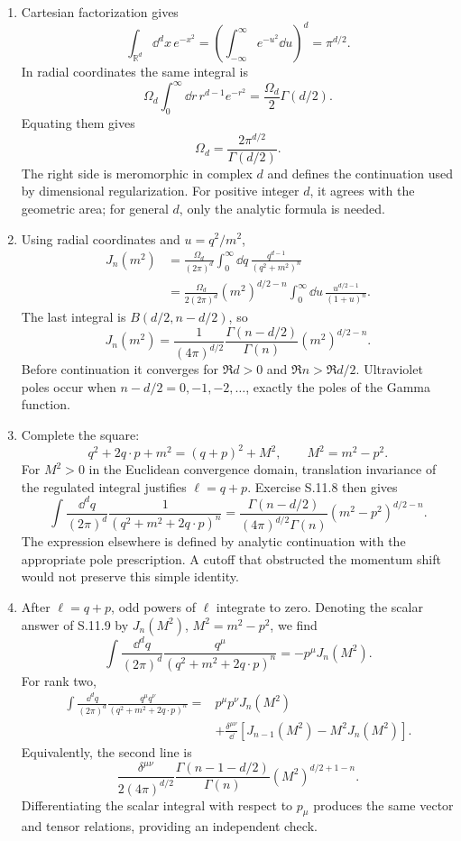 \begin{enumerate}
\begin{enumerate}
\item
Cartesian factorization gives
\[
 \int_{\mathbb R^d}\dd^dx\,e^{-x^2}
 =\left(\int_{-\infty}^{\infty}e^{-u^2}\dd u\right)^d
 =\pi^{d/2}.
\]
In radial coordinates the same integral is
\[
 \Omega_d\int_0^\infty \dd r\,r^{d-1}e^{-r^2}
 =\frac{\Omega_d}{2}\Gamma(d/2).
\]
Equating them gives
\[
 \boxed{\qquad
 \Omega_d=\frac{2\pi^{d/2}}{\Gamma(d/2)}.
 \qquad}
\]
The right side is meromorphic in complex \(d\) and defines the continuation
used by dimensional regularization.  For positive integer \(d\), it agrees
with the geometric area; for general \(d\), only the analytic formula is
needed.
\item
Using radial coordinates and \(u=q^2/m^2\),
\[
\begin{aligned}
 J_n(m^2)
 &=\frac{\Omega_d}{(2\pi)^d}\int_0^\infty
 \dd q\,\frac{q^{d-1}}{(q^2+m^2)^n}\\
 &=\frac{\Omega_d}{2(2\pi)^d}(m^2)^{d/2-n}
 \int_0^\infty \dd u\,\frac{u^{d/2-1}}{(1+u)^n}.
\end{aligned}
\]
The last integral is
\(B(d/2,n-d/2)\), so
\[
 \boxed{\;
 J_n(m^2)=\frac{1}{(4\pi)^{d/2}}
 \frac{\Gamma(n-d/2)}{\Gamma(n)}
 (m^2)^{d/2-n}.
 \;}
\]
Before continuation it converges for
\(\Re d>0\) and \(\Re n>\Re d/2\).  Ultraviolet poles occur when
\(n-d/2=0,-1,-2,\ldots\), exactly the poles of the Gamma function.
\item
Complete the square:
\[
 q^2+2q\cdot p+m^2=(q+p)^2+M^2,\qquad M^2=m^2-p^2.
\]
For \(M^2>0\) in the Euclidean convergence domain, translation invariance of
the regulated integral justifies \(\ell=q+p\).  Exercise S.11.8 then gives
\[
 \boxed{\;
 \int\frac{\dd^dq}{(2\pi)^d}
 \frac{1}{(q^2+m^2+2q\cdot p)^n}
 =\frac{\Gamma(n-d/2)}
 {(4\pi)^{d/2}\Gamma(n)}
 (m^2-p^2)^{d/2-n}.
 \;}
\]
The expression elsewhere is defined by analytic continuation with the
appropriate pole prescription.  A cutoff that obstructed the momentum shift
would not preserve this simple identity.
\item
After \(\ell=q+p\), odd powers of \(\ell\) integrate to zero.  Denoting the
scalar answer of S.11.9 by \(J_n(M^2)\), \(M^2=m^2-p^2\), we find
\[
 \boxed{\;
 \int\frac{\dd^dq}{(2\pi)^d}
 \frac{q^\mu}{(q^2+m^2+2q\cdot p)^n}
 =-p^\mu J_n(M^2).
 \;}
\]
For rank two,
\[
\begin{aligned}
 \int\frac{\dd^dq}{(2\pi)^d}
 \frac{q^\mu q^\nu}{(q^2+m^2+2q\cdot p)^n}
 ={}&p^\mu p^\nu J_n(M^2)\\
 &+\frac{\delta^{\mu\nu}}{\dd}
 [J_{n-1}(M^2)-M^2J_n(M^2)].
\end{aligned}
\]
Equivalently, the second line is
\[
 \frac{\delta^{\mu\nu}}{2(4\pi)^{d/2}}
 \frac{\Gamma(n-1-d/2)}{\Gamma(n)}
 (M^2)^{d/2+1-n}.
\]
Differentiating the scalar integral with respect to \(p_\mu\) produces the
same vector and tensor relations, providing an independent check.
\end{enumerate}


\end{enumerate}

